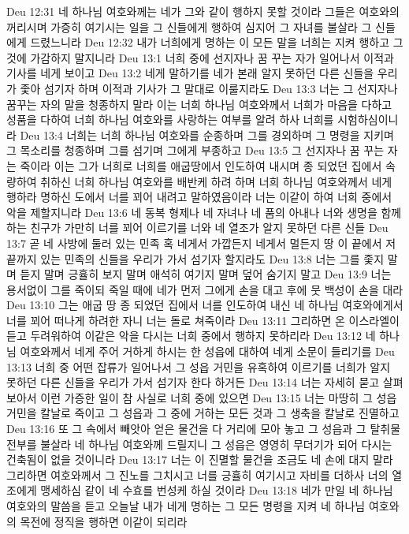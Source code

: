 Deu 12:31  네 하나님 여호와께는 네가 그와 같이 행하지 못할 것이라 그들은 여호와의 꺼리시며 가증히 여기시는 일을 그 신들에게 행하여 심지어 그 자녀를 불살라 그 신들에게 드렸느니라
Deu 12:32  내가 너희에게 명하는 이 모든 말을 너희는 지켜 행하고 그것에 가감하지 말지니라
Deu 13:1  너희 중에 선지자나 꿈 꾸는 자가 일어나서 이적과 기사를 네게 보이고
Deu 13:2  네게 말하기를 네가 본래 알지 못하던 다른 신들을 우리가 좇아 섬기자 하며 이적과 기사가 그 말대로 이룰지라도
Deu 13:3  너는 그 선지자나 꿈꾸는 자의 말을 청종하지 말라 이는 너희 하나님 여호와께서 너희가 마음을 다하고 성품을 다하여 너희 하나님 여호와를 사랑하는 여부를 알려 하사 너희를 시험하심이니라
Deu 13:4  너희는 너희 하나님 여호와를 순종하며 그를 경외하며 그 명령을 지키며 그 목소리를 청종하며 그를 섬기며 그에게 부종하고
Deu 13:5  그 선지자나 꿈 꾸는 자는 죽이라 이는 그가 너희로 너희를 애굽땅에서 인도하여 내시며 종 되었던 집에서 속량하여 취하신 너희 하나님 여호와를 배반케 하려 하며 너희 하나님 여호와께서 네게 행하라 명하신 도에서 너를 꾀어 내려고 말하였음이라 너는 이같이 하여 너희 중에서 악을 제할지니라
Deu 13:6  네 동복 형제나 네 자녀나 네 품의 아내나 너와 생명을 함께하는 친구가 가만히 너를 꾀어 이르기를 너와 네 열조가 알지 못하던 다른 신들
Deu 13:7  곧 네 사방에 둘러 있는 민족 혹 네게서 가깝든지 네게서 멀든지 땅 이 끝에서 저 끝까지 있는 민족의 신들을 우리가 가서 섬기자 할지라도
Deu 13:8  너는 그를 좇지 말며 듣지 말며 긍휼히 보지 말며 애석히 여기지 말며 덮어 숨기지 말고
Deu 13:9  너는 용서없이 그를 죽이되 죽일 때에 네가 먼저 그에게 손을 대고 후에 뭇 백성이 손을 대라
Deu 13:10  그는 애굽 땅 종 되었던 집에서 너를 인도하여 내신 네 하나님 여호와에게서 너를 꾀어 떠나게 하려한 자니 너는 돌로 쳐죽이라
Deu 13:11  그리하면 온 이스라엘이 듣고 두려워하여 이같은 악을 다시는 너희 중에서 행하지 못하리라
Deu 13:12  네 하나님 여호와께서 네게 주어 거하게 하시는 한 성읍에 대하여 네게 소문이 들리기를
Deu 13:13  너희 중 어떤 잡류가 일어나서 그 성읍 거민을 유혹하여 이르기를 너희가 알지 못하던 다른 신들을 우리가 가서 섬기자 한다 하거든
Deu 13:14  너는 자세히 묻고 살펴보아서 이런 가증한 일이 참 사실로 너희 중에 있으면
Deu 13:15  너는 마땅히 그 성읍 거민을 칼날로 죽이고 그 성읍과 그 중에 거하는 모든 것과 그 생축을 칼날로 진멸하고
Deu 13:16  또 그 속에서 빼앗아 얻은 물건을 다 거리에 모아 놓고 그 성읍과 그 탈취물 전부를 불살라 네 하나님 여호와께 드릴지니 그 성읍은 영영히 무더기가 되어 다시는 건축됨이 없을 것이니라
Deu 13:17  너는 이 진멸할 물건을 조금도 네 손에 대지 말라 그리하면 여호와께서 그 진노를 그치시고 너를 긍휼히 여기시고 자비를 더하사 너의 열조에게 맹세하심 같이 네 수효를 번성케 하실 것이라
Deu 13:18  네가 만일 네 하나님 여호와의 말씀을 듣고 오늘날 내가 네게 명하는 그 모든 명령을 지켜 네 하나님 여호와의 목전에 정직을 행하면 이같이 되리라
